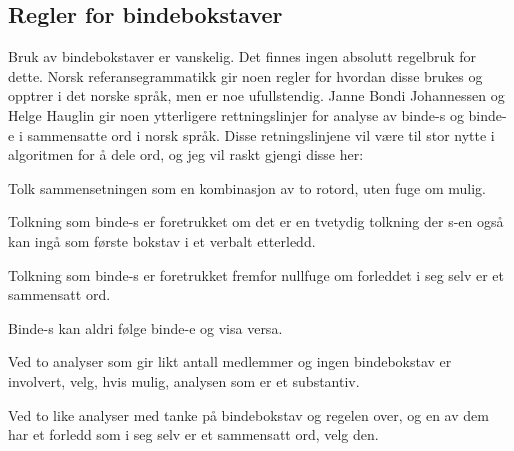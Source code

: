 \subsection{Regler for bindebokstaver}
\label{sec:reg-bind}

Bruk av bindebokstaver er vanskelig. Det finnes ingen absolutt regelbruk for dette. Norsk referansegrammatikk\cite{faarlund1997norsk} gir noen regler for hvordan disse brukes og opptrer i det norske språk, men er noe ufullstendig. Janne Bondi Johannessen og Helge Hauglin gir noen ytterligere rettningslinjer for analyse av binde-s og binde-e i sammensatte ord i norsk språk. Disse retningslinjene vil være til stor nytte i algoritmen for å dele ord, og jeg vil raskt gjengi disse her\cite{johannessen1996automatic}:

\begin{enum}
	\item Tolk sammensetningen som en kombinasjon av to rotord, uten fuge om mulig.
	
		\newline
	
	\item Tolkning som binde-s er foretrukket om det er en tvetydig tolkning der s-en også kan ingå som første bokstav i et verbalt etterledd.
	
		\newline
	
	\item Tolkning som binde-s er foretrukket fremfor nullfuge om forleddet i seg selv er et sammensatt ord.
	
		\newline
	
	\item Binde-s kan aldri følge binde-e og visa versa.
		
		\newline
	
	\item Ved to analyser som gir likt antall medlemmer og ingen bindebokstav er involvert, velg, hvis mulig, analysen som er et substantiv.
		
		\newline
	
	\item Ved to like analyser med tanke på bindebokstav og regelen over, og en av dem har et forledd som i seg selv er et sammensatt ord, velg den.
		

\end{enum}
